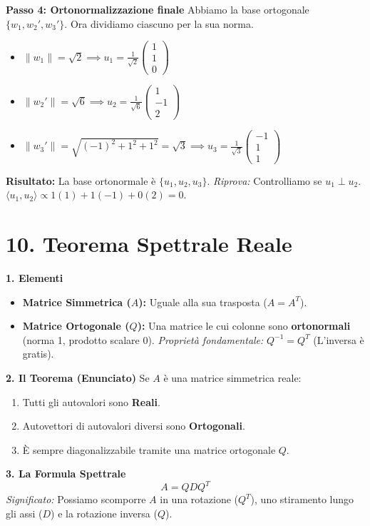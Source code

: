 \documentclass[10pt,a4paper]{article}
\begin{document}
\textbf{Passo 4: Ortonormalizzazione finale}
Abbiamo la base ortogonale $\{w_1, w_2', w_3'\}$. Ora dividiamo ciascuno per la sua norma.
\begin{itemize}
    \item $\|w_1\| = \sqrt{2} \implies u_1 = \frac{1}{\sqrt{2}} \begin{pmatrix} 1 \\ 1 \\ 0 \end{pmatrix}$
    \item $\|w_2'\| = \sqrt{6} \implies u_2 = \frac{1}{\sqrt{6}} \begin{pmatrix} 1 \\ -1 \\ 2 \end{pmatrix}$
    \item $\|w_3'\| = \sqrt{(-1)^2+1^2+1^2} = \sqrt{3} \implies u_3 = \frac{1}{\sqrt{3}} \begin{pmatrix} -1 \\ 1 \\ 1 \end{pmatrix}$
\end{itemize}

\textbf{Risultato:} La base ortonormale è $\{u_1, u_2, u_3\}$.
\textit{Riprova:} Controlliamo se $u_1 \perp u_2$.
$\langle u_1, u_2 \rangle \propto 1(1) + 1(-1) + 0(2) = 0$. 

\section*{10. Teorema Spettrale Reale}

\begin{tcolorbox}[colback=yellow!10!white,colframe=yellow!75!black,title=\textbf{}]
\textbf{1. Elementi}
\begin{itemize}
    \item \textbf{Matrice Simmetrica ($A$):} Uguale alla sua trasposta ($A = A^T$).
    \item \textbf{Matrice Ortogonale ($Q$):} Una matrice le cui colonne sono \textbf{ortonormali} (norma 1, prodotto scalare 0).
    \textit{Proprietà fondamentale:} $Q^{-1} = Q^T$ (L'inversa è gratis).
\end{itemize}

\textbf{2. Il Teorema (Enunciato)}
Se $A$ è una matrice simmetrica reale:
\begin{enumerate}
    \item Tutti gli autovalori sono \textbf{Reali}.
    \item Autovettori di autovalori diversi sono \textbf{Ortogonali}.
    \item È sempre diagonalizzabile tramite una matrice ortogonale $Q$.
\end{enumerate}

\textbf{3. La Formula Spettrale}
\[ A = Q D Q^T \]
\textit{Significato:} Possiamo scomporre $A$ in una rotazione ($Q^T$), uno stiramento lungo gli assi ($D$) e la rotazione inversa ($Q$).
\end{tcolorbox}
\end{document}
